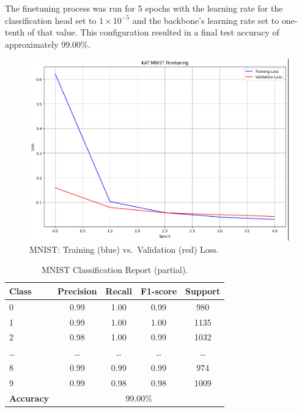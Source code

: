 \documentclass[conference]{IEEEtran}
\begin{document}
The finetuning process was run for 5 epochs with the learning rate for the
classification head set to \(1\times10^{-5}\) and the backbone’s learning rate
set to one-tenth of that value. This configuration resulted in a final test
accuracy of approximately 99.00\%.

\begin{figure}[H]
    \centering
    \includegraphics[width=0.65\linewidth]{mnist_train_val_loss.png}
    \caption{MNIST: Training (blue) vs.\ Validation (red) Loss.}
    \label{fig:mnist_loss}
\end{figure}

\begin{table}[H]
    \centering
    \scriptsize
    \begin{tabular}{lcccc}
        \toprule
        \textbf{Class}    & \textbf{Precision}          & \textbf{Recall} & \textbf{F1-score} & \textbf{Support} \\
        \midrule
        0                 & 0.99                        & 1.00            & 0.99              & 980              \\
        1                 & 0.99                        & 1.00            & 1.00              & 1135             \\
        2                 & 0.98                        & 1.00            & 0.99              & 1032             \\
        \ldots            & \ldots                      & \ldots          & \ldots            & \ldots           \\
        8                 & 0.99                        & 0.99            & 0.99              & 974              \\
        9                 & 0.99                        & 0.98            & 0.98              & 1009             \\
        \midrule
        \textbf{Accuracy} & \multicolumn{4}{c}{99.00\%}                                                          \\
        \bottomrule
    \end{tabular}
    \caption{MNIST Classification Report (partial).}
    \label{tab:mnist_report}
\end{table}
\end{document}
